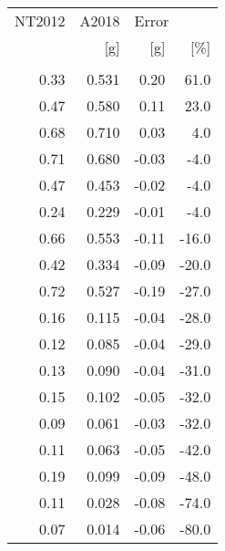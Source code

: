 \begin{tabular}{rrrr}
\toprule
NT2012 &  A2018 & \multicolumn{2}{l}{Error} \\
   [g] &    [g] &   [g] &   [\%] \\
       &        &       &       \\
\midrule
  0.33 &  0.531 &  0.20 &  61.0 \\
  0.47 &  0.580 &  0.11 &  23.0 \\
  0.68 &  0.710 &  0.03 &   4.0 \\
  0.71 &  0.680 & -0.03 &  -4.0 \\
  0.47 &  0.453 & -0.02 &  -4.0 \\
  0.24 &  0.229 & -0.01 &  -4.0 \\
  0.66 &  0.553 & -0.11 & -16.0 \\
  0.42 &  0.334 & -0.09 & -20.0 \\
  0.72 &  0.527 & -0.19 & -27.0 \\
  0.16 &  0.115 & -0.04 & -28.0 \\
  0.12 &  0.085 & -0.04 & -29.0 \\
  0.13 &  0.090 & -0.04 & -31.0 \\
  0.15 &  0.102 & -0.05 & -32.0 \\
  0.09 &  0.061 & -0.03 & -32.0 \\
  0.11 &  0.063 & -0.05 & -42.0 \\
  0.19 &  0.099 & -0.09 & -48.0 \\
  0.11 &  0.028 & -0.08 & -74.0 \\
  0.07 &  0.014 & -0.06 & -80.0 \\
\bottomrule
\end{tabular}

